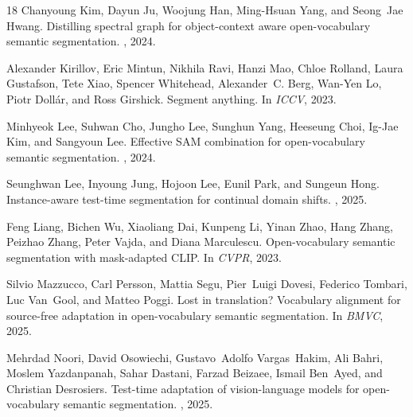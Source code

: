\documentclass{article}
\begin{document}
\begin{thebibliography}{18}
Chanyoung Kim, Dayun Ju, Woojung Han, Ming-Hsuan Yang, and Seong~Jae Hwang.
\newblock Distilling spectral graph for object-context aware open-vocabulary
  semantic segmentation.
, 2024.

Alexander Kirillov, Eric Mintun, Nikhila Ravi, Hanzi Mao, Chloe Rolland,
  Laura Gustafson, Tete Xiao, Spencer Whitehead, Alexander~C. Berg, Wan-Yen
  Lo, Piotr Doll{\'a}r, and Ross Girshick.
\newblock Segment anything.
\newblock In {\em ICCV}, 2023.

Minhyeok Lee, Suhwan Cho, Jungho Lee, Sunghun Yang, Heeseung Choi, Ig-Jae Kim,
  and Sangyoun Lee.
\newblock Effective SAM combination for open-vocabulary semantic segmentation.
, 2024.

Seunghwan Lee, Inyoung Jung, Hojoon Lee, Eunil Park, and Sungeun Hong.
\newblock Instance-aware test-time segmentation for continual domain shifts.
, 2025.

Feng Liang, Bichen Wu, Xiaoliang Dai, Kunpeng Li, Yinan Zhao, Hang Zhang,
  Peizhao Zhang, Peter Vajda, and Diana Marculescu.
\newblock Open-vocabulary semantic segmentation with mask-adapted CLIP.
\newblock In {\em CVPR}, 2023.

Silvio Mazzucco, Carl Persson, Mattia Segu, Pier~Luigi Dovesi, Federico
  Tombari, Luc Van~Gool, and Matteo Poggi.
\newblock Lost in translation? Vocabulary alignment for source-free adaptation
  in open-vocabulary semantic segmentation.
\newblock In {\em BMVC}, 2025.

Mehrdad Noori, David Osowiechi, Gustavo~Adolfo Vargas~Hakim, Ali Bahri, Moslem
  Yazdanpanah, Sahar Dastani, Farzad Beizaee, Ismail Ben~Ayed, and Christian
  Desrosiers.
\newblock Test-time adaptation of vision-language models for open-vocabulary
  semantic segmentation.
, 2025.


\end{thebibliography}
\end{document}
